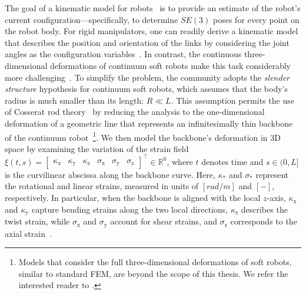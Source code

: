 The goal of a kinematic model for robots~\citep{siciliano2010robotics} is to provide an estimate of the robot’s current configuration—specifically, to determine $SE(3)$ poses for every point on the robot body.
For rigid manipulators, one can readily derive a kinematic model that describes the position and orientation of the links by considering the joint angles as the configuration variables~\citep{siciliano2010robotics}. In contrast, the continuous three-dimensional deformations of continuum soft robots make this task considerably more challenging~\citep{armanini2023soft}.
To simplify the problem, the community adopts the \emph{slender structure} hypothesis for continuum soft robots, which assumes that the body’s radius is much smaller than its length: $R \ll L$.
This assumption permits the use of Cosserat rod theory~\citep{cosserat1909theorie} by reducing the analysis to the one-dimensional deformation of a geometric line that represents an infinitesimally thin backbone of the continuum robot~\citep{gazzola2018forward}\footnote{Models that consider the full three-dimensional deformations of soft robots, similar to standard \gls{FEM}, are beyond the scope of this thesis. We refer the interested reader to \citet{faure2012sofa, coevoet2017software, armanini2023soft}.}.
We then model the backbone’s deformation in 3D space by examining the variation of the strain field $\xi(t,s) = \begin{bmatrix}
    \kappa_\mathrm{x} & \kappa_\mathrm{y} & \kappa_\mathrm{z} & \sigma_\mathrm{x} & \sigma_\mathrm{y} & \sigma_\mathrm{z}
\end{bmatrix}^\top \in \mathbb{R}^6$,
where $t$ denotes time and $s \in (0,L]$ is the curvilinear abscissa along the backbone curve. Here, $\kappa_*$ and $\sigma_*$ represent the rotational and linear strains, measured in units of $[\si{rad \per m}]$ and $[-]$, respectively. In particular, when the backbone is aligned with the local $z$-axis, $\kappa_\mathrm{x}$ and $\kappa_\mathrm{y}$ capture bending strains along the two local directions, $\kappa_\mathrm{z}$ describes the twist strain, while $\sigma_\mathrm{x}$ and $\sigma_\mathrm{y}$ account for shear strains, and $\sigma_\mathrm{z}$ corresponds to the axial strain~\citep{della2023model}.

